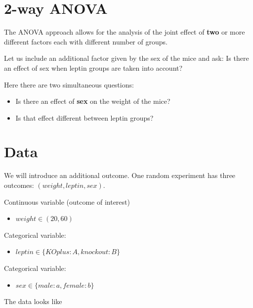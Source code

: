\documentclass[
]{book}
\providecommand{\tightlist}{%
  \setlength{\itemsep}{0pt}\setlength{\parskip}{0pt}}
\begin{document}
\hypertarget{way-anova}{%
\section{2-way ANOVA}\label{way-anova}}

The ANOVA approach allows for the analysis of the joint effect of \textbf{two} or more different factors each with different number of groups.

Let us include an additional factor given by the sex of the mice and ask: Is there an effect of sex when leptin groups are taken into account?

Here there are two simultaneous questions:

\begin{itemize}
\item
  Is there an effect of \textbf{sex} on the weight of the mice?
\item
  Is that effect different between leptin groups?
\end{itemize}

\hypertarget{data-4}{%
\section{Data}\label{data-4}}

We will introduce an additional outcome. One random experiment has three outcomes: \((weight, leptin, sex)\).

Continuous variable (outcome of interest)

\begin{itemize}
\tightlist
\item
  \(weight \in (20, 60)\)
\end{itemize}

Categorical variable:

\begin{itemize}
\tightlist
\item
  \(leptin \in \{KOplus:A,knockout:B\}\)
\end{itemize}

Categorical variable:

\begin{itemize}
\tightlist
\item
  \(sex \in \{male:a,female:b\}\)
\end{itemize}

The data looks like
\end{document}
